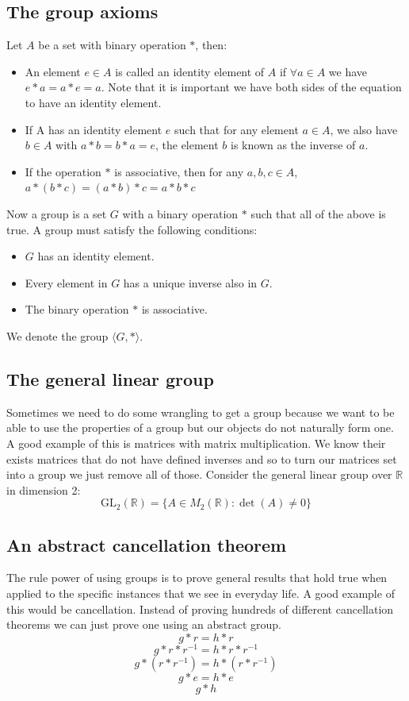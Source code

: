 \documentclass[12pt]{article}
\begin{document}
\subsection*{The group axioms}
Let \(A\) be a set with binary operation \(*\), then:
\begin{itemize}
    \item An element \(e\in A\) is called an identity element of \(A\) if \(\forall a\in A\) we have \(e*a=a*e=a\). Note that it is important we have both sides of the equation to have an identity element.
    \item If A has an identity element \(e\) such that for any element \(a\in A\), we also have \(b\in A\) with \(a*b=b*a=e\), the element \(b\) is known as the inverse of \(a\).
    \item If the operation \(*\) is associative, then for any \(a,b,c\in A\), \(a*(b*c)=(a*b)*c=a*b*c\)
\end{itemize}
Now a group is a set \(G\) with a binary operation \(*\) such that all of the above is true. A group must satisfy the following conditions:
\begin{itemize}
    \item \(G\) has an identity element.
    \item Every element in \(G\) has a unique inverse also in \(G\).
    \item The binary operation \(*\) is associative.
\end{itemize}
We denote the group \(\langle G,*\rangle\).
\subsection*{The general linear group}
Sometimes we need to do some wrangling to get a group because we want to be able to use the properties of a group but our objects do not naturally form one. A good example of this is matrices with matrix multiplication. We know their exists matrices that do not have defined inverses and so to turn our matrices set into a group we just remove all of those. Consider the general linear group over \(\mathbb{R}\) in dimension 2:
\[\text{GL}_2(\mathbb{R})=\{A\in M_2(\mathbb{R}):\det(A)\ne0\}\]
\subsection*{An abstract cancellation theorem}
The rule power of using groups is to prove general results that hold true when applied to the specific instances that we see in everyday life. A good example of this would be cancellation. Instead of proving hundreds of different cancellation theorems we can just prove one using an abstract group.
\[g*r=h*r\]
\[g*r*r^{-1}=h*r*r^{-1}\]
\[g*(r*r^{-1})=h*(r*r^{-1})\]
\[g*e =h*e\]
\[g*h\]
\end{document}
